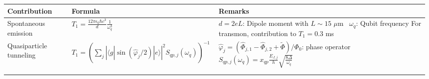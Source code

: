 \documentclass[]{article}
\newcommand{\ket}[1]{| #1 \rangle}
\newcommand{\bra}[1]{\langle #1 |}
\begin{document}
\begin{table}[h]
\hspace*{-2cm}
\centering
\begin{tabular}{|p{2cm}|p{5.7cm}|p{7.5cm}|}
	\hline 
Contribution	& Formula & Remarks \\ 
\hline \hline 
Spontaneous emission & $T_1 = \frac{12 \pi \epsilon_0 \hbar c^3}{d} \frac{1}{\omega_q^3}$~\cite{koch2007} & $d=2eL$: Dipole moment with $L\sim 15$ $\mu$m~\cite{koch2007} \newline $\omega_q$: Qubit frequency \newline
For transmon, contribution to $T_1=0.3$ ms~\cite{koch2007} \\
\hline
Quasiparticle tunneling & $T_1 = \left( \sum_j \left| \bra{g} \sin ( \hat{\varphi}_j/2) \ket{e} \right|^{2} S_{qp, j} (\omega_q) \right) ^{-1} $~\cite{catelani2011}& $\hat{\varphi}_j = (\hat{\Phi}_{j,1}-\hat{\Phi}_{j,2} + \tilde{\Phi}) / \Phi_0$: phase operator \newline
$S_{qp, j} (\omega_q) = x_{qp}\frac{E_{J, j}}{h}\sqrt{\frac{8 \Delta}{\omega_q}}$~\cite{yan2016} \newline 

\end{tabular}
\end{table}
\end{document}
